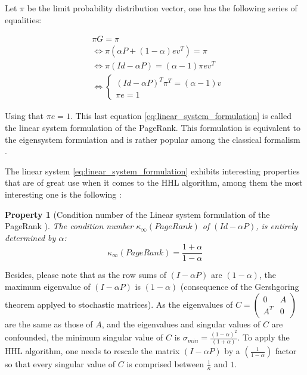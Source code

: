 \documentclass[sn-mathphys]{sn-jnl}%
\theoremstyle{thmstyleone}%
\newtheorem{propriete}[theo]{Property}
\theoremstyle{thmstyletwo}%
\theoremstyle{thmstylethree}%
\begin{document}
Let $\pi$ be the limit probability distribution vector, one has the
following series of equalities:

\begin{align}
    &\pi G = \pi \\
    &\Leftrightarrow \pi (\alpha P + (1-\alpha) ev^T) = \pi \\
    &\Leftrightarrow \pi (Id - \alpha P) = (\alpha - 1) \pi e v^T \\
    &\Leftrightarrow \left\{ \begin{array}{c}
        (Id - \alpha P)^T \pi^T = (\alpha - 1) v \\
           \pi e = 1
    \end{array} \label{eq:linear_system_formulation} \right.
\end{align}

Using that $\pi e = 1$. This last equation
\ref{eq:linear_system_formulation} is called the linear system
formulation of the PageRank. This formulation is equivalent to the
eigensystem formulation and is rather popular among the classical
formalism \cite{langville_meyer_2004, gleich_2015}.

The linear system \ref{eq:linear_system_formulation} exhibits
interesting properties that are of great use when it comes to the HHL
algorithm, among them the most interesting one is the following :

\begin{propriete}[Condition number of the Linear system formulation of the PageRank \cite{langville_meyer_2004}]
    The condition number $\kappa_\infty(PageRank)$ of $(Id - \alpha P)$, is entirely determined by $\alpha$:
    \begin{equation}
        \kappa_\infty(PageRank) = \frac{1+\alpha}{1-\alpha}
    \end{equation}
    
\end{propriete}

Besides, please note that as the row sums of $(I - \alpha P)$ are
$(1-\alpha)$, the maximum eigenvalue of $(I - \alpha P)$ is
$(1 - \alpha)$ (consequence of the Gershgoring theorem applyed to
stochastic matrices). As the eigenvalues of
$C = \begin{pmatrix} 0 & A \\ A^T & 0 \end{pmatrix}$ are the same as
those of $A$, and the eigenvalues and singular values of $C$ are
confounded, the minimum singular value of $C$ is
$\sigma_{min} = \frac{(1-\alpha)^2}{(1+\alpha)}$. To apply the HHL
algorithm, one needs to rescale the matrix $(I-\alpha P)$ by a
$(\frac{1}{1-\alpha})$ factor so that every singular value of $C$ is
comprised between $\frac{1}{\kappa}$ and $1$.
\end{document}
